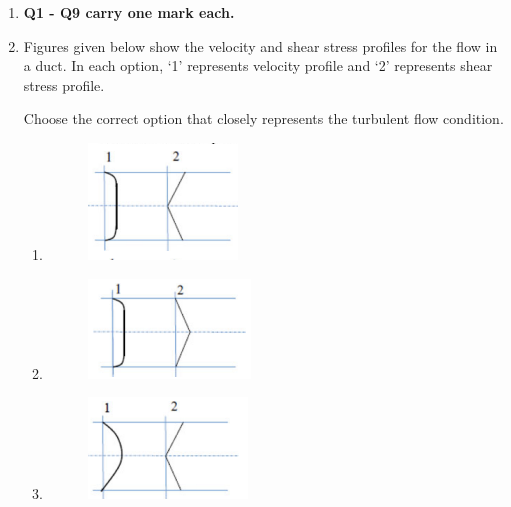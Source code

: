 \documentclass[12pt]{article}
\begin{document}
\begin{enumerate}

\item[] \textbf{Q1 - Q9 carry one mark each.}

\item Figures given below show the velocity and shear stress profiles for the flow in a duct. 
In each option, `1' represents velocity profile and `2' represents shear stress profile.

Choose the correct option that closely represents the turbulent flow condition.  

\begin{enumerate}
\item \begin{figure}[H]
    \centering
    \includegraphics[width=0.5\columnwidth]{figs/ass4_b_q1_a.png}
    \caption{}
    \label{fig:placeholder}
\end{figure} 
\item \begin{figure}[H]
    \centering
    \includegraphics[width=0.5\columnwidth]{figs/ass4_b_q1_b.png}
    \caption{}
    \label{fig:placeholder}
\end{figure}
\item \begin{figure}[H]
    \centering
    \includegraphics[width=0.5\columnwidth]{figs/ass4_b_q1_c.png}

\end{figure}
\end{enumerate}
\end{enumerate}
\end{document}
